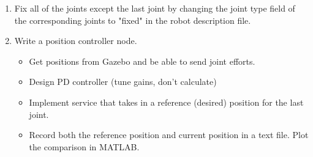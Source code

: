 \documentclass[10pt]{article}
\begin{document}
\begin{enumerate}
	\item Fix all of the joints except the last joint by changing the joint type field of the corresponding joints to "fixed" in the robot description file.
	
	\item Write a position controller node.
	
	\begin{itemize}
		\item Get positions from Gazebo and be able to send joint efforts.
		
		\item Design PD controller (tune gains, don't calculate)
		
		\item Implement service that takes in a reference (desired) position for the last joint.
		
		\item Record both the reference position and current position in a text file. Plot the comparison in MATLAB.
		
	\end{itemize}

\end{enumerate}
\end{document}
